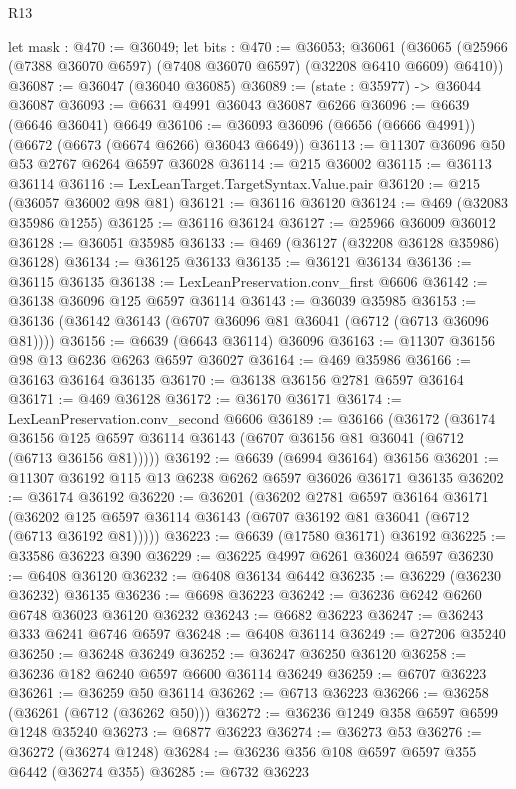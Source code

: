 \begin{lexlean}{R13}
\begin{coremodule}
  let mask : @470 := @36049;
  let bits : @470 := @36053;
  @36061 (@36065 (@25966 (@7388 @36070 @6597) (@7408 @36070 @6597) (@32208 @6410 @6609) @6410))
@36087 := @36047 (@36040 @36085)
@36089 := (state : @35977) -> @36044 @36087
@36093 := @6631 @4991 @36043 @36087 @6266
@36096 := @6639 (@6646 @36041) @6649
@36106 := @36093 @36096 (@6656 (@6666 @4991)) (@6672 (@6673 (@6674 @6266) @36043 @6649))
@36113 := @11307 @36096 @50 @53 @2767 @6264 @6597 @36028
@36114 := @215 @36002
@36115 := @36113 @36114
@36116 := LexLeanTarget.TargetSyntax.Value.pair
@36120 := @215 (@36057 @36002 @98 @81)
@36121 := @36116 @36120
@36124 := @469 (@32083 @35986 @1255)
@36125 := @36116 @36124
@36127 := @25966 @36009 @36012
@36128 := @36051 @35985
@36133 := @469 (@36127 (@32208 @36128 @35986) @36128)
@36134 := @36125 @36133
@36135 := @36121 @36134
@36136 := @36115 @36135
@36138 := LexLeanPreservation.conv_first @6606
@36142 := @36138 @36096 @125 @6597 @36114
@36143 := @36039 @35985
@36153 := @36136 (@36142 @36143 (@6707 @36096 @81 @36041 (@6712 (@6713 @36096 @81))))
@36156 := @6639 (@6643 @36114) @36096
@36163 := @11307 @36156 @98 @13 @6236 @6263 @6597 @36027
@36164 := @469 @35986
@36166 := @36163 @36164 @36135
@36170 := @36138 @36156 @2781 @6597 @36164
@36171 := @469 @36128
@36172 := @36170 @36171
@36174 := LexLeanPreservation.conv_second @6606
@36189 := @36166
    (@36172
      (@36174 @36156 @125 @6597 @36114 @36143 (@6707 @36156 @81 @36041 (@6712 (@6713 @36156 @81)))))
@36192 := @6639 (@6994 @36164) @36156
@36201 := @11307 @36192 @115 @13 @6238 @6262 @6597 @36026 @36171 @36135
@36202 := @36174 @36192
@36220 := @36201
    (@36202
      @2781
      @6597
      @36164
      @36171
      (@36202 @125 @6597 @36114 @36143 (@6707 @36192 @81 @36041 (@6712 (@6713 @36192 @81)))))
@36223 := @6639 (@17580 @36171) @36192
@36225 := @33586 @36223 @390
@36229 := @36225 @4997 @6261 @36024 @6597
@36230 := @6408 @36120
@36232 := @6408 @36134 @6442
@36235 := @36229 (@36230 @36232) @36135
@36236 := @6698 @36223
@36242 := @36236 @6242 @6260 @6748 @36023 @36120 @36232
@36243 := @6682 @36223
@36247 := @36243 @333 @6241 @6746 @6597
@36248 := @6408 @36114
@36249 := @27206 @35240
@36250 := @36248 @36249
@36252 := @36247 @36250 @36120
@36258 := @36236 @182 @6240 @6597 @6600 @36114 @36249
@36259 := @6707 @36223
@36261 := @36259 @50 @36114
@36262 := @6713 @36223
@36266 := @36258 (@36261 (@6712 (@36262 @50)))
@36272 := @36236 @1249 @358 @6597 @6599 @1248 @35240
@36273 := @6877 @36223
@36274 := @36273 @53
@36276 := @36272 (@36274 @1248)
@36284 := @36236 @356 @108 @6597 @6597 @355 @6442 (@36274 @355)
@36285 := @6732 @36223

\end{coremodule}
\end{lexlean}
